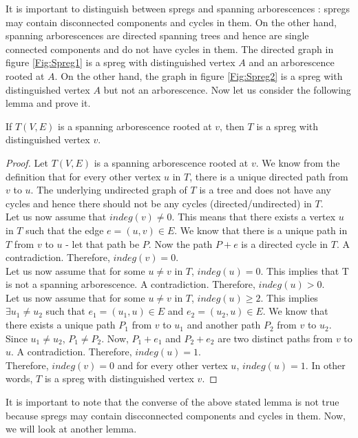 It is important to distinguish between spregs and spanning arborescences : spregs may contain disconnected components and cycles in them. On the other hand, spanning arborescences are directed spanning trees and hence are single connected components and do not have cycles in them. The directed graph in figure \ref{Fig:Spreg1} is a spreg with distinguished vertex $A$ and an arborescence rooted at $A$. On the other hand, the graph in figure \ref{Fig:Spreg2} is a spreg with distinguished vertex $A$ but not an arborescence. Now let us consider the following lemma and prove it.
\noindent\\
\begin{lemma} If $T(V,E)$ is a spanning arborescence rooted at $v$, then $T$ is a spreg with distinguished vertex $v$.
\end{lemma}
\begin{proof}
Let $T(V,E)$ is a spanning arborescence rooted at $v$. We know from the definition that for every other vertex $u$ in $T$, there is a unique directed path from $v$ to $u$. The underlying undirected graph of $T$ is a tree and does not have any cycles and hence there should not be any cycles (directed/undirected) in $T$.\\
Let us now assume that $indeg(v) \neq 0$. This means that there exists a vertex $u$ in $T$ such that the edge $e = (u,v)\in E$. We know that there is a unique path in $T$ from $v$ to $u$ - let that path be $P$. Now the path $P+e$ is a directed cycle in $T$. A contradiction. Therefore, $indeg(v) = 0$.\\
Let us now assume that for some $u \neq v$ in $T$, $indeg(u) = 0$. This implies that T is not a spanning arborescence.  A contradiction. Therefore, $indeg(u) > 0$. \\
Let us now assume that for some $u \neq v$ in $T$, $indeg(u) \geq 2$. This implies $\exists u_1 \neq u_2$ such that $e_1 = (u_1,u) \in E$ and $e_2 = (u_2,u) \in E$. We know that there exists a unique path $P_1$ from $v$ to $u_1$ and another path $P_2$ from $v$ to $u_2$. Since $u_1 \neq u_2$, $P_1 \neq P_2$. Now, $P_1+e_1$ and $P_2+e_2$ are two distinct paths from $v$ to $u$. A contradiction. Therefore, $indeg(u) = 1$.\\
Therefore,  $indeg(v) = 0$ and for every other vertex $u$, $indeg(u) = 1$. In other words, $T$ is a spreg with distinguished vertex $v$.
\end{proof}
\noindent It is important to note that the converse of the above stated lemma is not true because spregs may contain discconnected components and cycles in them. Now, we will look at another lemma.
